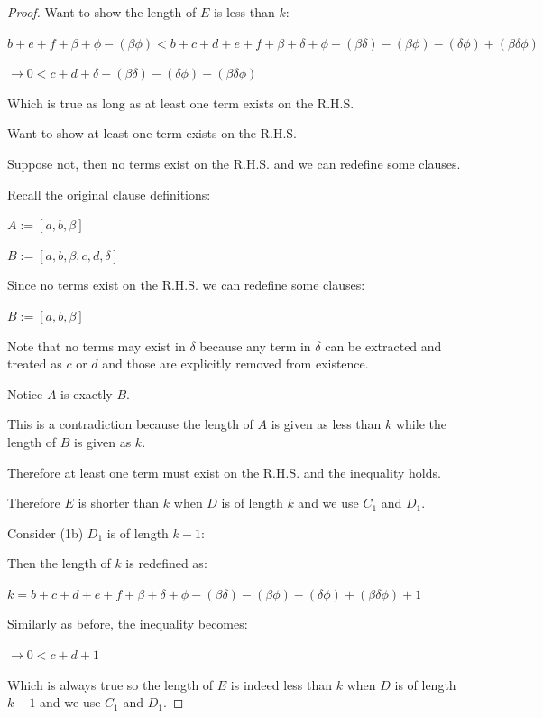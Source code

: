 \documentclass[manuscript]{acmart}
\begin{document}
\begin{proof}
        Want to show the length of $E$ is less than $k$:

        $b + e + f + \beta + \phi - (\beta \phi) < b + c + d + e + f + 
        \beta + \delta + \phi - (\beta \delta) - (\beta \phi) - (\delta \phi) + (\beta \delta \phi)$

        $\rightarrow 0 < c + d + \delta - (\beta \delta) 
        - (\delta \phi) + (\beta \delta \phi)$

        Which is true as long as at least one term exists on the R.H.S.

        Want to show at least one term exists on the R.H.S.

        Suppose not, then no terms exist on the R.H.S. and we can redefine some clauses.

        Recall the original clause definitions:

        $A := [a, b, \beta]$

        $B := [a, b, \beta, c, d, \delta]$

        Since no terms exist on the R.H.S. we can redefine some clauses:

        $B := [a, b, \beta]$

        Note that no terms may exist in $\delta$ because any term in $\delta$ can be extracted and treated as $c$ or $d$ and those are explicitly removed from existence.

        Notice $A$ is exactly $B$.

        This is a contradiction because the length of $A$ is given as less than $k$ while the length of $B$ is given as $k$.

        Therefore at least one term must exist on the R.H.S. and the inequality holds.

        Therefore $E$ is shorter than $k$ when $D$ is of length $k$ and we use $C_1$ and $D_1$.

        Consider (1b) $D_1$ is of length $k - 1$:

        Then the length of $k$ is redefined as:

        $k = b + c + d + e + f + \beta + \delta + \phi - (\beta \delta) 
        - (\beta \phi) - (\delta \phi) + (\beta \delta \phi) + 1$

        Similarly as before, the inequality becomes:

        $\rightarrow 0 < c + d + 1$

        Which is always true so the length of $E$ is indeed less than $k$ when $D$ is of length $k - 1$ and we use $C_1$ and $D_1$.


\end{proof}
\end{document}
